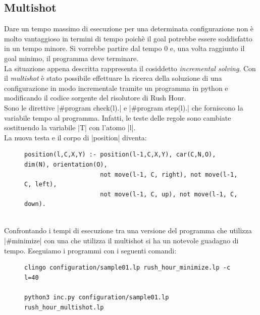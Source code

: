 \documentclass[10pt, a4paper, oneside]{article}
\begin{document}



\subsection{Multishot}
Dare un tempo massimo di esecuzione per una determinata configurazione non è molto vantaggioso in termini di tempo poichè il goal potrebbe essere soddisfatto in un tempo minore. Si vorrebbe partire dal tempo 0 e, una volta raggiunto il goal minimo, il programma deve terminare.\\

\noindent
La situazione appena descritta rappresenta il cosiddetto \emph{incremental solving}. Con il \emph{multishot} è stato possibile effettuare la ricerca della soluzione di una configurazione in modo incrementale tramite un programma in python e modificando il codice sorgente del risolutore di Rush Hour. \\

\noindent
Sono le direttive |#program check(l).| e |#program step(l).| che forniscono la variabile tempo al programma. Infatti, le teste delle regole sono cambiate sostituendo la variabile |T| con l'atomo |l|. \\

\noindent
La nuova testa e il corpo di |position| diventa:
\begin{figure}[H]
\centering
\begin{verbatim}
position(l,C,X,Y) :- position(l-1,C,X,Y), car(C,N,O), dim(N), orientation(O), 
                     not move(l-1, C, right), not move(l-1, C, left), 
                     not move(l-1, C, up), not move(l-1, C, down).
\end{verbatim}
\end{figure}


\noindent
\\Confrontando i tempi di esecuzione tra una versione del programma che utilizza |#minimize| con una che utilizza il multishot si ha un notevole guadagno di tempo. Eseguiamo i programmi con i seguenti comandi:
\begin{figure}[H]
\centering
\begin{verbatim}
clingo configuration/sample01.lp rush_hour_minimize.lp -c l=40

python3 inc.py configuration/sample01.lp rush_hour_multishot.lp
\end{verbatim}
\end{figure}
\end{document}

